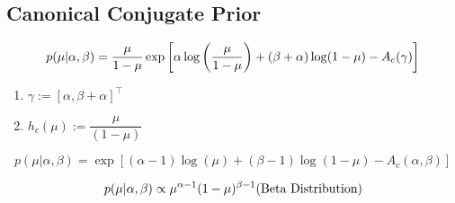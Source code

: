 \subsection{Canonical Conjugate Prior \cite{ism-1}}

\[
    p(\mu | \alpha, \beta) = \dfrac{\mu }{1 - \mu} \exp \left[\alpha \log \left(\dfrac{\mu} {1 - \mu}\right) + (\beta + \alpha) \log(1 - \mu) - A_c(\gamma) \right]
\]
\begin{enumerate}[itemsep=0.2cm]
    \item $\gamma := [\alpha, \beta + \alpha]^\top$

    \item $h_c(\mu) := \dfrac{\mu}{(1 - \mu)}$

\end{enumerate}

\[
    p(\mu | \alpha, \beta) = \exp [(\alpha - 1) \log (\mu) + (\beta - 1) \log(1 - \mu) - A_c(\alpha, \beta)]
\]

\[
    p(\mu | \alpha, \beta) \propto \mu^{\alpha-1} (1 - \mu)^{\beta-1}
    \hfill
    \text{(Beta Distribution)}
\]














